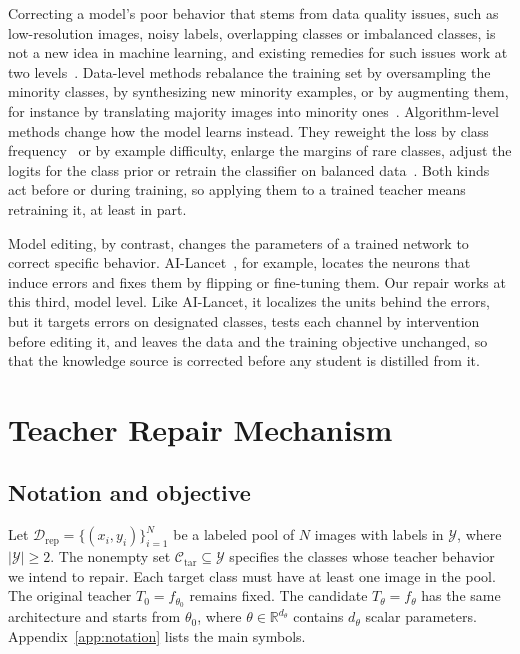 \documentclass[review,number,sort&compress]{elsarticle}
\theoremstyle{definition}
\begin{document}
Correcting a model's poor behavior that stems from data quality issues,
such as low-resolution images, noisy labels, overlapping classes or
imbalanced classes, is not a new idea
in machine learning, and existing remedies for such issues work at two
levels~\citep{zhang2023deep}. Data-level
methods rebalance the training set by oversampling the minority
classes, by synthesizing new minority examples,
or by augmenting them, for instance
by translating majority images into minority ones~\citep{zhang2023deep}.
Algorithm-level methods change how the model learns instead. They reweight
the loss by class frequency~\citep{cui2019class} or by example
difficulty, enlarge the margins of rare classes, adjust the logits for
the class prior or retrain the classifier on balanced
data~\citep{zhang2023deep}. Both kinds act before or during training,
so applying them to a trained teacher means retraining it, at least in
part.

Model editing, by contrast, changes the parameters of a trained
network to correct specific
behavior.
AI-Lancet~\citep{zhao2021ailancet}, for example, locates the neurons that
induce errors and fixes them by flipping or fine-tuning them. Our repair
works at this third, model level. Like AI-Lancet, it localizes the units
behind the errors, but it targets errors on designated classes, tests
each channel by intervention before editing it, and leaves the data and
the training objective unchanged, so that the knowledge source is
corrected before any student is distilled from it.

\section{Teacher Repair Mechanism}
\label{sec:repair}
\label{sec:repair-flow}


\subsection{Notation and objective}

Let $\mathcal{D}_{\mathrm{rep}}=\{(x_i,y_i)\}_{i=1}^{N}$ be
a labeled pool of $N$ images with labels in $\mathcal{Y}$,
where $|\mathcal{Y}|\geq2$.
The nonempty set
$\mathcal{C}_{\mathrm{tar}}\subseteq\mathcal{Y}$ specifies the
classes whose teacher behavior we intend to repair. Each
target class must have at least one image in the pool.
The original teacher $T_0=f_{\theta_0}$ remains fixed.
The candidate $T_\theta=f_\theta$ has the same architecture
and starts from $\theta_0$, where
$\theta\in\mathbb{R}^{d_\theta}$ contains $d_\theta$ scalar
parameters. Appendix~\ref{app:notation} lists the main symbols.
\end{document}
